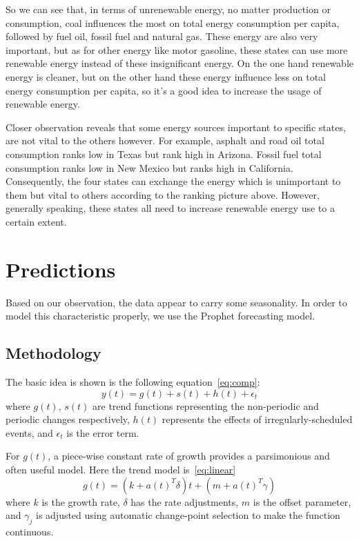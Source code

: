 \documentclass{mcmthesis}
\begin{document}
So we can see that, in terms of unrenewable energy, no matter production or consumption, coal influences the most on total energy consumption per capita, followed by fuel oil, fossil fuel and natural gas.
These energy are also very important, but as for other energy like motor gasoline, these states can use more renewable energy instead of these insignificant energy.
On the one hand renewable energy is cleaner, but on the other hand these energy influence less on total energy consumption per capita, so it's a good idea to increase the usage of renewable energy.

Closer observation reveals that some energy sources important to specific states, are not vital to the others however.
For example, asphalt and road oil total consumption ranks low in Texas but rank high in Arizona.
Fossil fuel total consumption ranks low in New Mexico but ranks high in California. Consequently, the four states can exchange the energy which is unimportant to them but vital to others according to the ranking picture above.
However, generally speaking, these states all need to increase renewable energy use to a certain extent.

\section{Predictions}
Based on our observation, the data appear to carry some seasonality. In order to model this characteristic properly, we use the Prophet forecasting model.

\subsection{Methodology}
The basic idea is shown is the following equation~\eqref{eq:comp}:
\begin{equation}  \label{eq:comp}
y(t) = g(t) + s(t) + h(t) + \epsilon_t
\end{equation}
where $g(t)$, $s(t)$ are trend functions representing the non-periodic and periodic changes respectively, $h(t)$ represents the effects of irregularly-scheduled events, and $\epsilon_t$ is the error term.

For $g(t)$, a piece-wise constant rate of growth provides a parsimonious and often useful model. Here the trend model is~\eqref{eq:linear}
\begin{equation}  \label{eq:linear}
g(t) = \left(k + a(t)^{T}\delta\right)t + \left(m + a(t)^{T}\gamma\right)
\end{equation}
where $k$ is the growth rate, $\delta$ has the rate adjustments, $m$ is the offset parameter,
and $\gamma_j$ is adjusted using automatic change-point selection to make the function continuous.
\end{document}
